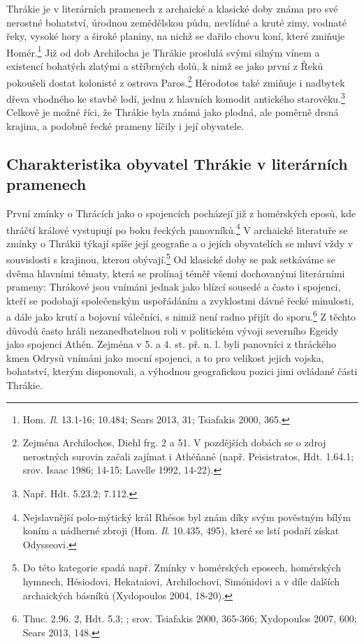 Thrákie je v literárních pramenech z archaické a klasické doby známa pro své nerostné bohatství, úrodnou zemědělskou půdu, nevlídné a kruté zimy, vodnaté řeky, vysoké hory a široké planiny, na nichž se dařilo chovu koní, které zmiňuje Homér.\footnote{Hom. {\em Il}. 13.1-16; 10.484; Sears 2013, 31; Tsiafakis 2000, 365.} Již od dob Archilocha je Thrákie proslulá svými silným vínem a existencí bohatých zlatými a stříbrných dolů, k nimž se jako první z Řeků pokoušeli dostat kolonisté z ostrova Paros.\footnote{Zejména Archilochos, Diehl frg. 2 a 51. V pozdějších dobách se o zdroj nerostných surovin začali zajímat i Athéňané (např. Peisistratos, Hdt. 1.64.1; srov. Isaac 1986; 14-15; Lavelle 1992, 14-22).} Hérodotos také zmiňuje i nadbytek dřeva vhodného ke stavbě lodí, jednu z hlavních komodit antického starověku.\footnote{Např. Hdt. 5.23.2; 7.112.} Celkově je možné říci, že Thrákie byla známá jako plodná, ale poměrně drsná krajina, a podobně řecké prameny líčily i její obyvatele.

\subsection[charakteristika-obyvatel-thrákie-v-literárních-pramenech]{Charakteristika obyvatel Thrákie v literárních pramenech}

První zmínky o Thrácích jako o spojencích pocházejí již z homérských eposů, kde thráčtí králové vystupují po boku řeckých panovníků.\footnote{Nejslavnější polo-mýtický král Rhésos byl znám díky svým pověstným bílým koním a nádherné zbroji (Hom. {\em Il}. 10.435, 495), které se lstí podaří získat Odysseovi.} V archaické literatuře se zmínky o Thrákii týkají spíše její geografie a o jejích obyvatelích se mluví vždy v souvislosti s krajinou, kterou obývají.\footnote{Do této kategorie spadá např. Zmínky v homérských eposech, homérských hymnech, Hésiodovi, Hekataiovi, Archilochovi, Simónidovi a v díle dalších archaických básníků (Xydopoulos 2004, 18-20).} Od klasické doby se pak setkáváme se dvěma hlavními tématy, která se prolínaj téměř všemi dochovanými literárními prameny: Thrákové jsou vnímáni jednak jako blízcí sousedé a často i spojenci, kteří se podobají společenským uspořádáním a zvyklostmi dávné řecké minulosti, a dále jako krutí a bojovní válečníci, s nimiž není radno přijít do sporu.\footnote{Thuc. 2.96. 2, Hdt. 5.3; ; srov. Tsiafakis 2000, 365-366; Xydopoulos 2007, 600; Sears 2013, 148.} Z těchto důvodů často hráli nezanedbatelnou roli v politickém vývoji severního Egeidy jako spojenci Athén. Zejména v 5. a 4. st. př. n. l. byli panovníci z thráckého kmen Odrysů vnímáni jako mocní spojenci, a to pro velikost jejich vojska, bohatství, kterým disponovali, a výhodnou geografickou pozici jimi ovládané části Thrákie.

